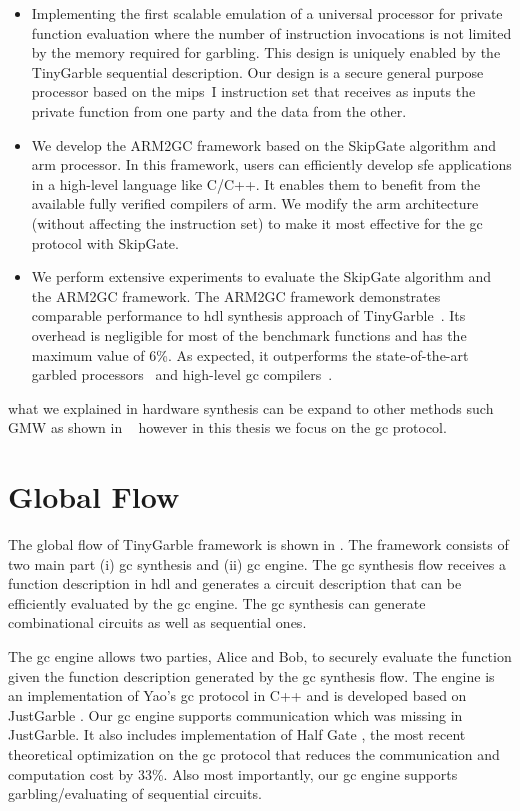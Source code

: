 \begin{itemize}
\item
  Implementing the first scalable emulation of a universal processor for private function evaluation where the number of instruction invocations is not limited by the memory required for garbling.
  This design is uniquely enabled by the TinyGarble sequential description.
  Our design is a secure general purpose processor based on the \acrshort{mips}~I instruction set that receives as inputs the private function from one party and the data from the other.
\item We develop the ARM2GC framework based on the SkipGate algorithm and \acrshort{arm} processor.
    In this framework, users can efficiently develop \acrshort{sfe} applications in a high-level language like C/C++.
    It enables them to benefit from the available fully verified compilers of \acrshort{arm}.
    We modify the \acrshort{arm} architecture (without affecting the instruction set) to make it most effective for the \acrshort{gc} protocol with SkipGate.
\item We perform extensive experiments to evaluate the SkipGate algorithm and the ARM2GC framework.
    The ARM2GC framework demonstrates comparable performance to \acrshort{hdl} synthesis approach of TinyGarble~\cite{songhori2015tinygarble}.
    Its overhead is negligible for most of the benchmark functions and has the maximum value of 6\%.
    As expected, it outperforms the state-of-the-art garbled processors~\cite{wang2016secure, songhori2016garbledcpu} and high-level \acrshort{gc} compilers~\cite{holzer2012secure, mood2016frigate}.
\end{itemize}

what we explained in hardware synthesis can be expand to other methods such GMW as shown in ~\cite{demmler2015automated} however in this thesis we focus on the \acrshort{gc} protocol.

\section{Global Flow}
The global flow of TinyGarble framework is shown in .
The framework consists of two main part (i) \acrshort{gc} synthesis and (ii) \acrshort{gc} engine.
The \acrshort{gc} synthesis flow receives a function description in \acrshort{hdl} and generates a circuit description that can be efficiently evaluated by the \acrshort{gc} engine.
The \acrshort{gc} synthesis can generate combinational circuits as well as sequential ones.

The \acrshort{gc} engine allows two parties, Alice and Bob, to securely evaluate the function given the function description generated by the \acrshort{gc} synthesis flow.
The engine is an implementation of Yao's \acrshort{gc} protocol in C++ and is developed based on JustGarble \cite{bellare2013efficient}.
Our \acrshort{gc} engine supports communication which was missing in JustGarble.
It also includes implementation of Half Gate \cite{zahur2015two}, the most recent theoretical optimization on the \acrshort{gc} protocol that reduces the communication and computation cost by 33\%.
Also most importantly, our \acrshort{gc} engine supports garbling/evaluating of sequential circuits.

